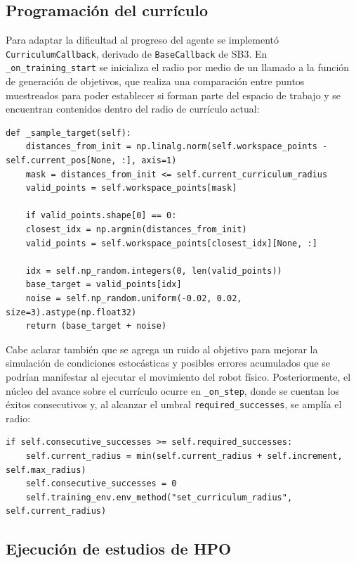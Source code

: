 \subsection{Programación del currículo}

Para adaptar la dificultad al progreso del agente se implementó \texttt{CurriculumCallback}, derivado de \texttt{BaseCallback} de SB3. En \texttt{\_on\_training\_start} se inicializa el radio por medio de un llamado a la función de generación de objetivos, que realiza una comparación entre puntos muestreados para poder establecer si forman parte del espacio de trabajo y se encuentran contenidos dentro del radio de currículo actual:\\

\begin{lstlisting}
def _sample_target(self):
	distances_from_init = np.linalg.norm(self.workspace_points - self.current_pos[None, :], axis=1)
	mask = distances_from_init <= self.current_curriculum_radius
	valid_points = self.workspace_points[mask]
	
	if valid_points.shape[0] == 0:
	closest_idx = np.argmin(distances_from_init)
	valid_points = self.workspace_points[closest_idx][None, :]
	
	idx = self.np_random.integers(0, len(valid_points))
	base_target = valid_points[idx]
	noise = self.np_random.uniform(-0.02, 0.02, size=3).astype(np.float32)
	return (base_target + noise)
\end{lstlisting}

Cabe aclarar también que se agrega un ruido al objetivo para mejorar la simulación de condiciones estocásticas y posibles errores acumulados que se podrían manifestar al ejecutar el movimiento del robot físico. Posteriormente, el núcleo del avance sobre el currículo ocurre en \texttt{\_on\_step}, donde se cuentan los éxitos consecutivos y, al alcanzar el umbral \texttt{required\_successes}, se amplía el radio:  \\

\begin{lstlisting}
if self.consecutive_successes >= self.required_successes:
	self.current_radius = min(self.current_radius + self.increment, self.max_radius)
	self.consecutive_successes = 0
	self.training_env.env_method("set_curriculum_radius", self.current_radius)
\end{lstlisting}


\subsection{Ejecución de estudios de HPO}

